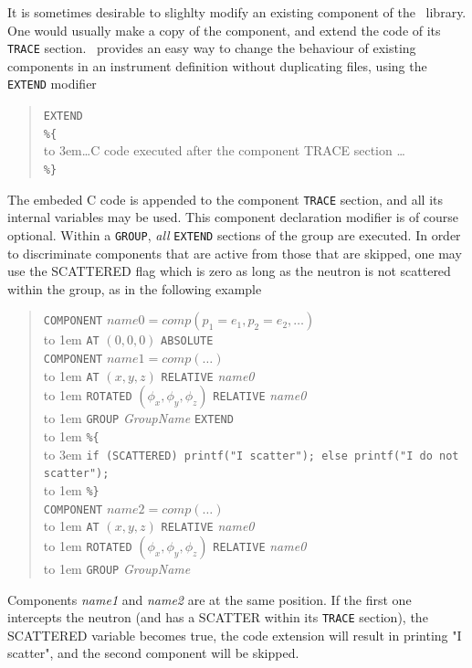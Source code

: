 {It is sometimes desirable to slighlty modify an existing component of the \MCS\ library. One would usually make a copy of the component, and extend the code of its \texttt{TRACE} section. \MCS\ provides an easy way to change the behaviour of existing components in an instrument definition without duplicating files, using the \texttt{EXTEND} modifier 
\begin{quote}
  \texttt{EXTEND} \\
  \verb|%{| \\
  \hbox to 3em{}\ldots C code executed after the component TRACE section \ldots \\
  \verb|%}|
\end{quote} 
The embeded C code is appended to the component \texttt{TRACE} section, and all its internal variables may be used.
This component declaration modifier is of course optional. Within a \texttt{GROUP}, \emph{all} \texttt{EXTEND} sections of the group are executed. In order to discriminate components that are active from those that are skipped, one may use the SCATTERED flag which is zero as long as the neutron is not scattered within the group, as in the following example  
\begin{quote}
  \texttt{COMPONENT} $\textit{name0} =
    \textit{comp}(p_1 = e_1, p_2 = e_2, \ldots)$ \\
  \hbox to 1em{} \texttt{AT} $(0,0,0)$ \texttt{ABSOLUTE} \\
  \texttt{COMPONENT} $\textit{name1} =
    \textit{comp}(\ldots)$ \\
  \hbox to 1em{} \texttt{AT} $(x,y,z)$ \texttt{RELATIVE} \textit{name0} \\
  \hbox to 1em{} \texttt{ROTATED} $(\phi_x,\phi_y,\phi_z)$ \texttt{RELATIVE} \textit{name0} \\
  \hbox to 1em{} \texttt{GROUP} \textit{GroupName} \texttt{EXTEND} \\
  \hbox to 1em{} \verb|%{| \\
  \hbox to 3em{} \verb+if (SCATTERED) printf("I scatter"); else printf("I do not scatter");+\\
  \hbox to 1em{} \verb|%}| \\
  \texttt{COMPONENT} $\textit{name2} =
    \textit{comp}(\ldots)$ \\
  \hbox to 1em{} \texttt{AT} $(x,y,z)$ \texttt{RELATIVE} \textit{name0} \\
  \hbox to 1em{} \texttt{ROTATED} $(\phi_x,\phi_y,\phi_z)$ \texttt{RELATIVE} \textit{name0} \\
  \hbox to 1em{} \texttt{GROUP} \textit{GroupName}
\end{quote}
Components \emph{name1} and \emph{name2} are at the same position. If the first one intercepts the neutron (and has a SCATTER within its \texttt{TRACE} section), the SCATTERED variable becomes true, the code extension will result in printing "I scatter", and the second component will be skipped.


}
